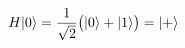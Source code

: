 \documentclass[preview]{standalone}
\begin{document}
\begin{align*}
\special{dvisvgm:raw <g id='unique000'>}H|0\rangle = \frac{1}{\sqrt{2}}\big(|0\rangle + |1\rangle\big) = |+\rangle\special{dvisvgm:raw </g>}
\end{align*}
\end{document}
